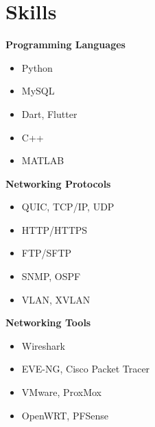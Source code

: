 \section{Skills}

\begin{paracol}{3} %
	\begin{onecolentry}
		\textbf{Programming Languages}
		\begin{itemize}[leftmargin=0.5cm, itemsep=0.1cm]
			\item Python
			\item MySQL
			\item Dart, Flutter
			\item C++
			\item MATLAB
		\end{itemize}
	\end{onecolentry}
	\switchcolumn
	
	\begin{onecolentry}
		\textbf{Networking Protocols}
		\begin{itemize}[leftmargin=0.5cm, itemsep=0.1cm]
			\item QUIC, TCP/IP, UDP
			\item HTTP/HTTPS
			\item FTP/SFTP
			\item SNMP, OSPF
			\item VLAN, XVLAN
		\end{itemize}
	\end{onecolentry}
	
	\switchcolumn
	\begin{onecolentry}
		\textbf{Networking Tools}
		\begin{itemize}[leftmargin=0.5cm, itemsep=0.1cm]
			\item Wireshark
			\item EVE-NG, Cisco Packet Tracer
			\item VMware, ProxMox
			\item OpenWRT, PFSense
		\end{itemize}
	\end{onecolentry}
\end{paracol}

\vspace{0.3 cm} %

